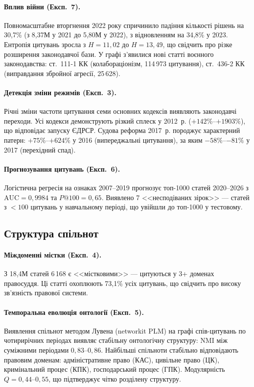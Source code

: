 \documentclass[11pt]{article}
\begin{document}
\paragraph{Вплив війни (Експ.~7).}
Повномасштабне вторгнення 2022 року спричинило падіння кількості рішень на 30,7\% (з 8,37М у 2021 до 5,80М у 2022), з відновленням на 34,8\% у 2023.
Ентропія цитувань зросла з $H = 11{,}02$ до $H = 13{,}49$, що свідчить про різке розширення законодавчої бази.
У графі з'явилися нові статті воєнного законодавства: ст.~111-1 КК (колабораціонізм, 114\,973 цитування), ст.~436-2 КК (виправдання збройної агресії, 25\,628).

\paragraph{Детекція зміни режимів (Експ.~3).}
Річні зміни частоти цитування семи основних кодексів виявляють законодавчі переходи.
Усі кодекси демонструють різкий сплеск у 2012~р. ($+142\%$--$+1903\%$), що відповідає запуску ЄДРСР.
Судова реформа 2017~р. породжує характерний патерн: $+75\%$--$+624\%$ у 2016 (випереджальні цитування), за яким $-58\%$--$-81\%$ у 2017 (перехідний спад).

\paragraph{Прогнозування цитувань (Експ.~6).}
Логістична регресія на ознаках 2007--2019 прогнозує топ-1000 статей 2020--2026 з $\text{AUC} = 0{,}9984$ та $P@100 = 0{,}65$.
Виявлено 7 <<несподіваних зірок>> --- статей з $<100$ цитувань у навчальному періоді, що увійшли до топ-1000 у тестовому.

\subsection{Структура спільнот}

\paragraph{Міждоменні містки (Експ.~4).}
З 18,4М статей 6\,168 є <<містковими>> --- цитуються у 3+ доменах правосуддя.
Ці статті охоплюють 73,1\% усіх цитувань, що свідчить про високу зв'язність правової системи.

\paragraph{Темпоральна еволюція онтології (Експ.~5).}
Виявлення спільнот методом Лувена (networkit PLM) на графі спів-цитувань по чотирирічних періодах виявляє стабільну онтологічну структуру: NMI між суміжними періодами $0{,}83$--$0{,}86$.
Найбільші спільноти стабільно відповідають правовим доменам: адміністративне право (КАС), цивільне право (ЦК), кримінальний процес (КПК), господарський процес (ГПК).
Модулярність $Q = 0{,}44$--$0{,}55$, що підтверджує чітко розділену структуру.
\end{document}
